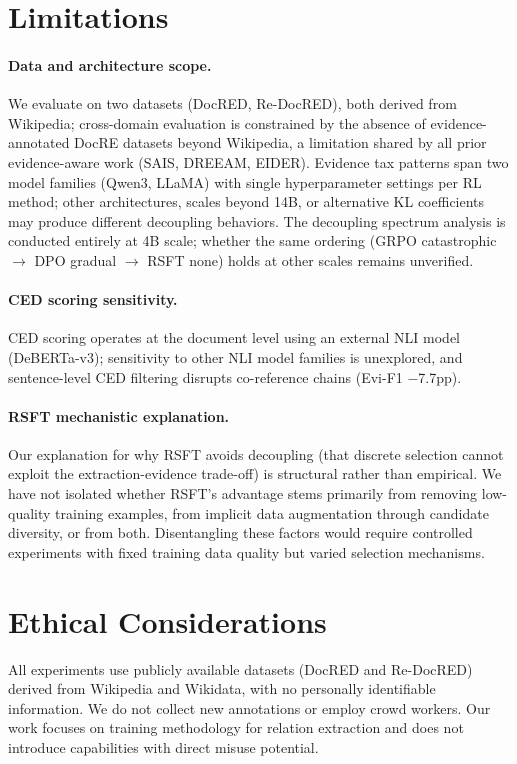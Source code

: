 \section*{Limitations}

\paragraph{Data and architecture scope.}
We evaluate on two datasets (DocRED, Re-DocRED), both derived from Wikipedia; cross-domain evaluation is constrained by the absence of evidence-annotated DocRE datasets beyond Wikipedia, a limitation shared by all prior evidence-aware work (SAIS, DREEAM, EIDER).
Evidence tax patterns span two model families (Qwen3, LLaMA) with single hyperparameter settings per RL method; other architectures, scales beyond 14B, or alternative KL coefficients may produce different decoupling behaviors. The decoupling spectrum analysis is conducted entirely at 4B scale; whether the same ordering (GRPO catastrophic $\to$ DPO gradual $\to$ RSFT none) holds at other scales remains unverified.

\paragraph{CED scoring sensitivity.}
CED scoring operates at the document level using an external NLI model (DeBERTa-v3); sensitivity to other NLI model families is unexplored, and sentence-level CED filtering disrupts co-reference chains (Evi-F1 $-$7.7pp).

\paragraph{RSFT mechanistic explanation.}
Our explanation for why RSFT avoids decoupling (that discrete selection cannot exploit the extraction-evidence trade-off) is structural rather than empirical. We have not isolated whether RSFT's advantage stems primarily from removing low-quality training examples, from implicit data augmentation through candidate diversity, or from both. Disentangling these factors would require controlled experiments with fixed training data quality but varied selection mechanisms.

\section*{Ethical Considerations}
All experiments use publicly available datasets (DocRED and Re-DocRED) derived from Wikipedia and Wikidata, with no personally identifiable information. We do not collect new annotations or employ crowd workers. Our work focuses on training methodology for relation extraction and does not introduce capabilities with direct misuse potential.
